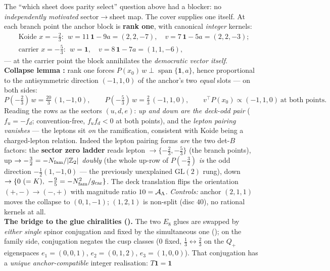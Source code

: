
\begin{keybox}
The ``which sheet does parity select'' question above had a blocker: no \emph{independently motivated}
sector$\to$sheet map. The cover supplies one itself. At each branch point the anchor block is \textbf{rank
one}, with canonical \emph{integer} kernels:
\[
\begin{aligned}
  &\text{Koide } x=-\tfrac23:\ \ w=11\,\mathbf1-9a=(2,2,-7),\quad v=7\,\mathbf1-5a=(2,2,-3);\\
  &\text{carrier } x=-\tfrac53:\ \ w=\mathbf 1,\quad v=8\,\mathbf1-7a=(1,1,-6),
\end{aligned}
\]
--- at the carrier point the block annihilates the \emph{democratic vector itself}. \textbf{Collapse lemma
\mE:} rank one forces $P(x_0)\,w\perp\operatorname{span}\{\mathbf1,a\}$, hence proportional to the
antisymmetric direction $(-1,1,0)$ of the anchor's two \emph{equal} slots --- on both sides:
\[
  P(-\tfrac23)\,w=\tfrac{20}{3}\,(1,-1,0),\qquad P(-\tfrac53)\,w=\tfrac23\,(-1,1,0),\qquad
  v^\top P(x_0)\propto(-1,1,0)\ \text{at both points} .
\]
Reading the rows as the sectors $(u,d,e)$: \emph{up and down are the deck-odd pair} ($f_u=-f_d$;
convention-free, $f_uf_d<0$ at both points), and the \emph{lepton pairing vanishes} --- the leptons sit
\emph{on} the ramification, consistent with Koide being a charged-lepton relation. Indeed the lepton
pairing forms \emph{are} the two det-$B$ factors: the \textbf{sector zero ladder} reads
lepton $\to\{-\tfrac23,-\tfrac53\}$ (the branch points), up $\to-\tfrac32=-N_{\mathrm{fam}}/|\mathbb{Z}_2|$ \emph{doubly}
(the whole up-row of $P(-\tfrac32)$ \emph{is} the odd direction $-\tfrac12(1,-1,0)$ --- the previously
unexplained $\mathrm{GL}(2)$ rung), down $\to\{0\ (=K),\ -\tfrac95=-\Nfam^2/\gcar\}$. The deck translation
flips the orientation $(+,-)\to(-,+)$ with magnitude ratio $10=\mathcal A_\Lambda$. \emph{Controls:} anchor $(2,1,1)$
moves the collapse to $(0,1,-1)$; $(1,2,1)$ is non-split (disc $40$), no rational kernels at all.
\smallskip\\
\noindent\textbf{The bridge to the glue chiralities ().} The two
$E_8$ glues are swapped by \emph{either single} spinor conjugation and fixed by the simultaneous one
(); on the family side, conjugation negates the cusp classes
($0$ fixed, $\tfrac13\leftrightarrow\tfrac23$ on the $Q_+$ eigenspaces $e_1=(0,0,1)$, $e_2=(0,1,2)$,
$e_3=(1,0,0)$). That conjugation has a \emph{unique anchor-compatible} integer realisation: $T\mathbf1=\mathbf1$

\end{keybox}
